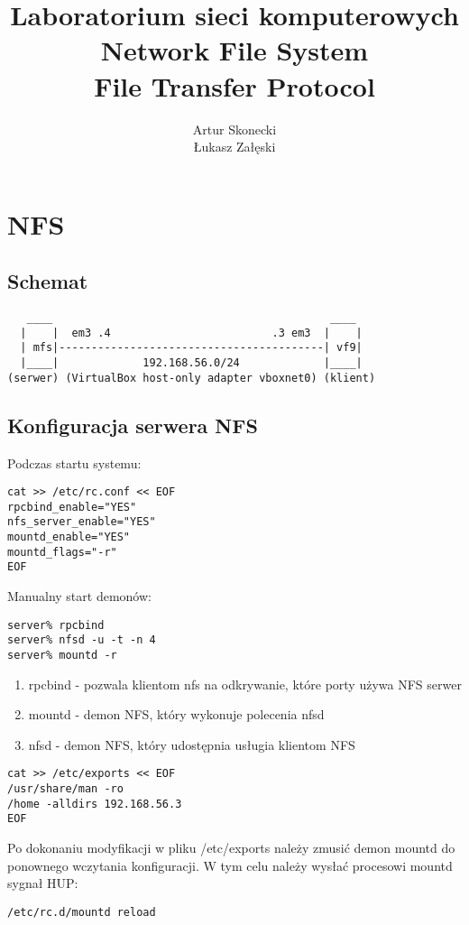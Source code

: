 \documentclass[a4paper,11pt]{article}
\title{\textbf{Laboratorium sieci komputerowych\\Network File System\\File Transfer Protocol}}
\author{Artur Skonecki\\Łukasz Załęski}
\begin{document}
\maketitle
\section{NFS}
\subsection{Schemat}
\begin{verbatim}
   ____                                           ____
  |    |  em3 .4                         .3 em3  |    |
  | mfs|-----------------------------------------| vf9|
  |____|             192.168.56.0/24             |____|
(serwer) (VirtualBox host-only adapter vboxnet0) (klient)

\end{verbatim}
\subsection{Konfiguracja serwera NFS}

Podczas startu systemu:

\begin{verbatim}
cat >> /etc/rc.conf << EOF
rpcbind_enable="YES"
nfs_server_enable="YES"
mountd_enable="YES"
mountd_flags="-r"
EOF
\end{verbatim}

Manualny start demonów:

\begin{verbatim}
server% rpcbind
server% nfsd -u -t -n 4
server% mountd -r
\end{verbatim}

\begin{enumerate}
\item rpcbind - pozwala klientom nfs na odkrywanie, które porty używa NFS serwer
\item mountd - demon NFS, który wykonuje polecenia nfsd
\item nfsd - demon NFS, który udostępnia usługia klientom NFS
\end{enumerate}


\begin{verbatim}
cat >> /etc/exports << EOF
/usr/share/man -ro
/home -alldirs 192.168.56.3
EOF
\end{verbatim}
Po dokonaniu modyfikacji w pliku /etc/exports należy zmusić demon mountd do ponownego wczytania konfiguracji. W tym celu należy wysłać procesowi mountd sygnał HUP:
\begin{verbatim}
/etc/rc.d/mountd reload
\end{verbatim}
\end{document}
